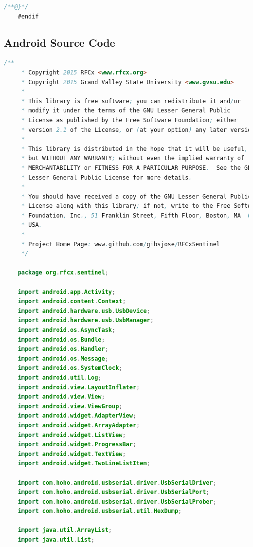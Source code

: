 \documentclass{article}
\numberwithin{figure}{section}
\numberwithin{equation}{section}
\begin{document}
{\begin{lstlisting}[language=C,label=lst:i2cmaster.h,caption=i2cmaster.h]
    /**@}*/
    #endif
\end{lstlisting}
\subsection{Android Source Code}\label{sect:android-source}
\begin{lstlisting}[language=Java,label=lst:devicelist,caption=DeviceListActivity.java]
    /**
     * Copyright 2015 RFCx <www.rfcx.org>
     * Copyright 2015 Grand Valley State University <www.gvsu.edu>
     *
     * This library is free software; you can redistribute it and/or
     * modify it under the terms of the GNU Lesser General Public
     * License as published by the Free Software Foundation; either
     * version 2.1 of the License, or (at your option) any later version.
     *
     * This library is distributed in the hope that it will be useful,
     * but WITHOUT ANY WARRANTY; without even the implied warranty of
     * MERCHANTABILITY or FITNESS FOR A PARTICULAR PURPOSE.  See the GNU
     * Lesser General Public License for more details.
     *
     * You should have received a copy of the GNU Lesser General Public
     * License along with this library; if not, write to the Free Software
     * Foundation, Inc., 51 Franklin Street, Fifth Floor, Boston, MA  02110-1301,
     * USA.
     *
     * Project Home Page: www.github.com/gibsjose/RFCxSentinel
     */

    package org.rfcx.sentinel;

    import android.app.Activity;
    import android.content.Context;
    import android.hardware.usb.UsbDevice;
    import android.hardware.usb.UsbManager;
    import android.os.AsyncTask;
    import android.os.Bundle;
    import android.os.Handler;
    import android.os.Message;
    import android.os.SystemClock;
    import android.util.Log;
    import android.view.LayoutInflater;
    import android.view.View;
    import android.view.ViewGroup;
    import android.widget.AdapterView;
    import android.widget.ArrayAdapter;
    import android.widget.ListView;
    import android.widget.ProgressBar;
    import android.widget.TextView;
    import android.widget.TwoLineListItem;

    import com.hoho.android.usbserial.driver.UsbSerialDriver;
    import com.hoho.android.usbserial.driver.UsbSerialPort;
    import com.hoho.android.usbserial.driver.UsbSerialProber;
    import com.hoho.android.usbserial.util.HexDump;

    import java.util.ArrayList;
    import java.util.List;


\end{lstlisting}}
\end{document}
